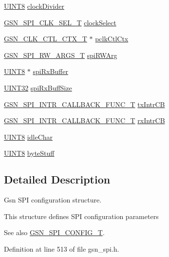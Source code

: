 \begin{DoxyCompactItemize}
\hyperlink{a00660_gab27e9918b538ce9d8ca692479b375b6a}{UINT8} \hyperlink{a00231_ae7807face22c73f3541066336176a60d}{clockDivider}
\item 
\hyperlink{a00655_gac4a300710a224a1971e5a78eae8eb89e}{GSN\_\-SPI\_\-CLK\_\-SEL\_\-T} \hyperlink{a00231_af879184c3660e99b8402d538c035fbc5}{clockSelect}
\item 
\hyperlink{a00039}{GSN\_\-CLK\_\-CTL\_\-CTX\_\-T} $\ast$ \hyperlink{a00231_a87fd9dda5636bd71a412693b96fed177}{pclkCtlCtx}
\item 
\hyperlink{a00239}{GSN\_\-SPI\_\-RW\_\-ARGS\_\-T} \hyperlink{a00231_acb4512599754c80bddd73e9a02574f9e}{spiRWArg}
\item 
\hyperlink{a00660_gab27e9918b538ce9d8ca692479b375b6a}{UINT8} $\ast$ \hyperlink{a00231_aa07b66f7f4a73b04e5ffaf3f29b4b414}{spiRxBuffer}
\item 
\hyperlink{a00660_gae1e6edbbc26d6fbc71a90190d0266018}{UINT32} \hyperlink{a00231_a0b720c9f52a6b5aa0634f432850766ec}{spiRxBuffSize}
\item 
\hyperlink{a00655_ga4319e7be0e14776c7cd2c7ff7ca8f2c2}{GSN\_\-SPI\_\-INTR\_\-CALLBACK\_\-FUNC\_\-T} \hyperlink{a00231_a4e134bf841774583e84c1b9d14aa928b}{txIntrCB}
\item 
\hyperlink{a00655_ga4319e7be0e14776c7cd2c7ff7ca8f2c2}{GSN\_\-SPI\_\-INTR\_\-CALLBACK\_\-FUNC\_\-T} \hyperlink{a00231_a764a17416df305e000c7f2c5d3edf2c2}{rxIntrCB}
\item 
\hyperlink{a00660_gab27e9918b538ce9d8ca692479b375b6a}{UINT8} \hyperlink{a00231_abf7d1a3fd39bc4650832af3d1f22a59d}{idleChar}
\item 
\hyperlink{a00660_gab27e9918b538ce9d8ca692479b375b6a}{UINT8} \hyperlink{a00231_a7607005ffbebdca79ab3c4d558d0e442}{byteStuff}
\end{DoxyCompactItemize}


\subsection{Detailed Description}
Gsn SPI configuration structure. 

This structure defines SPI configuration parameters

\begin{DoxySeeAlso}{See also}
\hyperlink{a00655_ga582e2b85ccb404b546fbe5a27f2113cb}{GSN\_\-SPI\_\-CONFIG\_\-T}. 
\end{DoxySeeAlso}


Definition at line 513 of file gsn\_\-spi.h.



